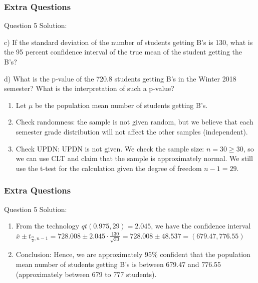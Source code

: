 \documentclass{beamer}
\begin{document}
\begin{frame}
\frametitle{Extra Questions}
\begin{block}{Question 5 Solution:}

c) If the standard deviation of the number of students getting B's is 130, what is the 95 percent confidence interval of the true mean of the student getting the B's?

d) What is the p-value of the 720.8 students getting B's in the Winter 2018 semester? What is the interpretation of such a p-value?

\begin{enumerate}

\item Let $\mu$ be the population mean number of students getting B's.

\item Check randomness: the sample is not given random, but we believe that each semester grade distribution will not affect the other samples (independent).

\item Check UPDN: UPDN is not given. We check the sample size: $n = 30 \ge 30$, so we can use CLT and claim that the sample is approximately normal. We still use the t-test for the calculation given the degree of freedom $n-1 = 29$.

\end{enumerate}
\end{block}
\end{frame}


\begin{frame}
\frametitle{Extra Questions}
\begin{block}{Question 5 Solution:}

\begin{enumerate}

\item From the technology $qt(0.975, 29) = 2.045$, we have the confidence interval $\bar x \pm t_{\frac{\alpha}{2},n-1} = 728.008 \pm 2.045 \cdot \frac{130}{\sqrt{30}} = 728.008 \pm 48.537 = (679.47, 776.55)$

\item Conclusion: Hence, we are approximately $95 \%$ confident that the population mean number of students getting B's is between 679.47 and 776.55 (approximately between 679 to 777 students).

\end{enumerate}
\end{block}
\end{frame}
\end{document}
